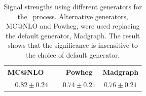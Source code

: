 %
\begin{table}[htp] 
\begin{center} 
\begin{tabular}{c|c|c} 
\hline 
MC@NLO   &  Powheg & Madgraph \\
\hline \hline 
$0.82 \pm 0.24$ & $0.74 \pm 0.21$ & $0.76 \pm 0.21$ \\
\hline 
\end{tabular} 
\caption{ Signal strengths 
using different generators for the \qqww\ process. Alternative generators,
MC@NLO and Powheg, were used replacing the default generator, Madgraph.
The result shows that the significance is insensitive to the choice
of default generator.} 
\label{tab:mu_diffgenerator} 
\end{center} 
\end{table} 
